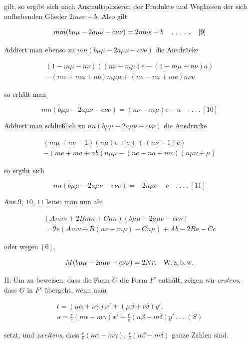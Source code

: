 gilt, so ergibt sich nach Ausmultiplizieren der Produkte und Weglassen der sich aufhebenden Glieder $2m\nu e+b$. Also gilt

\[
mm(b\mu\mu-2a\mu\nu-c\nu\nu)=2m\nu e+b\quad\mathinner{.\ .\ .\ .\ .}\quad[9]
\]

Addiert man ebenso zu $mn(b\mu\mu-2a\mu\nu-c\nu\nu)$ die Ausdrücke


\[
\begin{gathered}(1-m\mu-n\nu)((n\nu-m\mu)e-(1+m\mu+n\nu)a)\\-(me+ma+nb)m\mu\mu+(ne-na+mc)n\nu\nu\end{gathered}
\]

so erhält man

\[
mn(b\mu\mu-2a\mu\nu-c\nu\nu)=(n\nu-m\mu)e-a\quad .\ .\ .\ .\ [10]
\]

Addiert man schließlich zu $nn(b\mu\mu-2a\mu\nu-c\nu\nu)$ die Ausdrücke

\[
\begin{gathered}(m\mu+n\nu-1)(n\mu(e+a)+(n\nu+1)c)\\-(me+ma+nb)n\mu\mu-(ne-na+mc)(n\mu\nu+\mu)\end{gathered}
\]

so ergibt sich

\[
nn(b\mu\mu-2a\mu\nu-c\nu\nu)=-2n\mu e-c\quad .\ .\ .\ .\ [11]
\]

Aus $9$, $10$, $11$ leitet man nun ab:

\[
\begin{gathered}(Amm+2Bmn+Cnn)(b\mu\mu-2a\mu\nu-c\nu\nu)\\=2e(Am\nu+B(n\nu-m\mu)-Cn\mu)+Ab-2Ba-Cc\end{gathered}
\]

oder wegen $[6],$

\[
M(b\mu\mu-2a\mu\nu-c\nu\nu)=2Nr.\quad \text{W.\,z.\,b.\,w.}
\]

II. Um zu beweisen, dass die Form $G$ die Form $F'$ enthält, zeigen wir \emph{erstens}, dass $G$ in $F'$ übergeht, wenn man

\[
\begin{gathered}t=(\mu\alpha+\nu\gamma)x'+(\mu\beta+\nu\delta)y',\\u=\frac re(n\alpha-m\gamma)x'+\frac re(n\beta-m\delta)y'\ .\ .\ .\ (S)\end{gathered}
\]

setzt, und \emph{zweitens}, dass $\frac{r}{e}(n\alpha-m\gamma)$, $\frac{r}{e}(n\beta-m\delta)$ ganze Zahlen sind.

